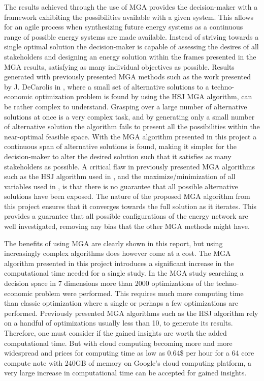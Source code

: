 The results achieved through the use of MGA provides the decision-maker with a framework exhibiting the possibilities available with a given system. This allows for an agile process when synthesizing future energy systems as a continuous range of possible energy systems are made available. Instead of striving towards a single optimal solution the decision-maker is capable of assessing the desires of all stakeholders and designing an energy solution within the frames presented in the MGA results, satisfying as many individual objectives as possible. 
Results generated with previously presented MGA methods such as the work presented by J. DeCarolis in \cite{DeCarolis_MGA}, where a small set of alternative solutions to a techno-economic optimization problem is found by using the HSJ MGA algorithm, can be rather complex to understand. Grasping over a large number of alternative solutions at once is a very complex task, and by generating only a small number of alternative solution the algorithm fails to present all the possibilities within the near-optimal feasible space. With the MGA algorithm presented in this project a continuous span of alternative solutions is found, making it simpler for the decision-maker to alter the desired solution such that it satisfies as many stakeholders as possible. 
A critical flaw in previously presented MGA algorithms such as the HSJ algorithm used in \cite{DeCarolis_MGA}, and the maximize/minimization of all variables used in \cite{Fabian_MGA}, is that there is no guarantee that all possible alternative solutions have been exposed. The nature of the proposed MGA algorithm from this project ensures that it converges towards the full solution as it iterates. This provides a guarantee that all possible configurations of the energy network are well investigated, removing any bias that the other MGA methods might have. 

The benefits of using MGA are clearly shown in this report, but using increasingly complex algorithms does however come at a cost. The MGA algorithm presented in this project introduces a significant increase in the computational time needed for a single study. In the MGA study searching a decision space in 7 dimensions more than 2000 optimizations of the techno-economic problem were performed. This requires much more computing time than classic optimization where a single or perhaps a few optimizations are performed. Previously presented MGA algorithms such as the HSJ \cite{DeCarolis_MGA} algorithm rely on a handful of optimizations usually less than 10, to generate its results. Therefore, one must consider if the gained insights are worth the added computational time. But with cloud computing becoming more and more widespread and prices for computing time as low as 0.64\$ per hour for a 64 core compute note with 240GB of memory \cite{Google_Cloud} on Google's cloud computing platform, a very large increase in computational time can be accepted for gained insights. 

